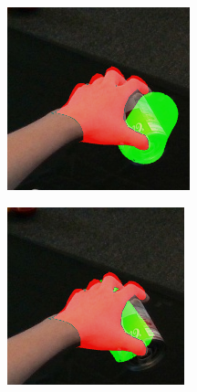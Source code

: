 \begin{figure}[h!]
\begin{subfigure}[b]{0.16\linewidth}
  \end{subfigure}
    \begin{subfigure}[b]{0.16\linewidth}
    \includegraphics[width=0.98\linewidth]{figs/9063_15}
  \end{subfigure}
    \begin{subfigure}[b]{0.16\linewidth}
    \includegraphics[width=0.98\linewidth]{figs/9063_19}
  \end{subfigure}  
  \vspace{0.2cm}
  

\end{figure}
